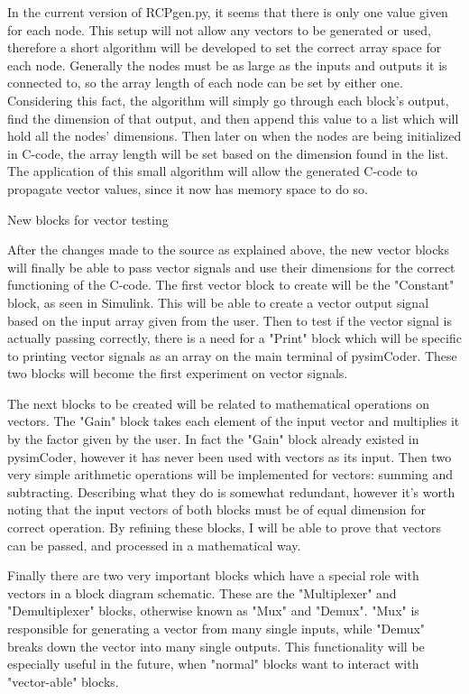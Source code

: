 \quad In the current version of RCPgen.py, it seems that there is only one value given for each node. This
setup will not allow any vectors to be generated or used, therefore a short algorithm will be developed to set
the correct array space for each node. Generally the nodes must be as large as the inputs and outputs it is
connected to, so the array length of each node can be set by either one. Considering this fact, the algorithm
will simply go through each block's output, find the dimension of that output, and then append this value to a
list which will hold all the nodes' dimensions. Then later on when the nodes are being initialized in C-code,
the array length will be set based on the dimension found in the list. The application of this small algorithm
will allow the generated C-code to propagate vector values, since it now has memory space to do so. 

\secc New blocks for vector testing

\quad After the changes made to the source as explained above, the new vector blocks will finally be able to
pass vector signals and use their dimensions for the correct functioning of the C-code. The first vector block
to create will be the "Constant" block, as seen in Simulink. This will be able to create a vector output signal
based on the input array given from the user. Then to test if the vector signal is actually passing correctly,
there is a need for a "Print" block which will be specific to printing vector signals as an array on the main
terminal of pysimCoder. These two blocks will become the first experiment on vector signals.

\quad The next blocks to be created will be related to mathematical operations on vectors. The "Gain" block
takes each element of the input vector and multiplies it by the factor given by the user. In fact the "Gain"
block already existed in pysimCoder, however it has never been used with vectors as its input. Then two very
simple arithmetic operations will be implemented for vectors: summing and subtracting. Describing what they do
is somewhat redundant, however it's worth noting that the input vectors of both blocks must be of equal
dimension for correct operation. By refining these blocks, I will be able to prove that vectors can be passed,
and processed in a mathematical way.

\quad Finally there are two very important blocks which have a special role with vectors in a block diagram
schematic. These are the "Multiplexer" and "Demultiplexer" blocks, otherwise known as "Mux" and "Demux". "Mux"
is responsible for generating a vector from many single inputs, while "Demux" breaks down the vector into many
single outputs. This functionality will be especially useful in the future, when "normal" blocks want to
interact with "vector-able" blocks.

